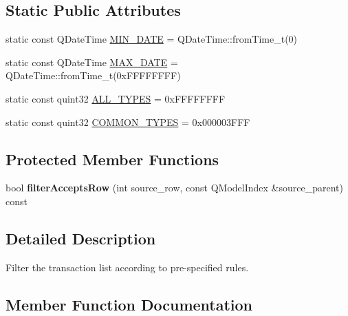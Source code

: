 \subsection*{Static Public Attributes}
\begin{DoxyCompactItemize}
\item 
static const Q\+Date\+Time \mbox{\hyperlink{class_transaction_filter_proxy_aac7bf4c1105641b19eb6f7c8741b502e}{M\+I\+N\+\_\+\+D\+A\+TE}} = Q\+Date\+Time\+::from\+Time\+\_\+t(0)
\item 
static const Q\+Date\+Time \mbox{\hyperlink{class_transaction_filter_proxy_a5ac7f4d41a56e44f4cc74ebeffb5a254}{M\+A\+X\+\_\+\+D\+A\+TE}} = Q\+Date\+Time\+::from\+Time\+\_\+t(0x\+F\+F\+F\+F\+F\+F\+F\+F)
\item 
static const quint32 \mbox{\hyperlink{class_transaction_filter_proxy_a845c1358f6cc8e60b6fae4725d2fc03f}{A\+L\+L\+\_\+\+T\+Y\+P\+ES}} = 0x\+F\+F\+F\+F\+F\+F\+FF
\item 
static const quint32 \mbox{\hyperlink{class_transaction_filter_proxy_a2aa26410f537c1c81acbe477ab9b7b0d}{C\+O\+M\+M\+O\+N\+\_\+\+T\+Y\+P\+ES}} = 0x000003\+F\+FF
\end{DoxyCompactItemize}
\subsection*{Protected Member Functions}
\begin{DoxyCompactItemize}
\item 
\mbox{\label{class_transaction_filter_proxy_a6ab964123a0a3f2a28049a44153fce49}} 
bool {\bfseries filter\+Accepts\+Row} (int source\+\_\+row, const Q\+Model\+Index \&source\+\_\+parent) const
\end{DoxyCompactItemize}


\subsection{Detailed Description}
Filter the transaction list according to pre-\/specified rules. 

\subsection{Member Function Documentation}
\mbox{\label{class_transaction_filter_proxy_a3ec04a38573eb59b8f246f54658d2702}} 
